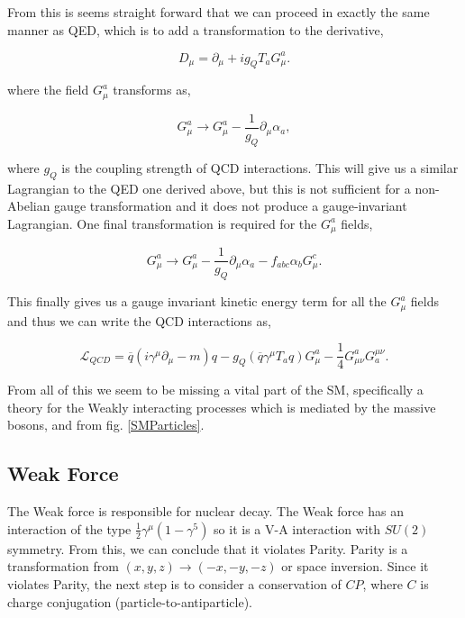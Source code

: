 From this is seems straight forward that we can proceed in exactly the same manner as QED, which is to add a transformation to the derivative,

\begin{equation}
D_\mu=\partial_\mu+ig_Q T_aG_\mu^a.
\end{equation}

where the field $G_\mu^a$ transforms as, 

\begin{equation}
G_\mu^a\rightarrow G_\mu^a-\frac{1}{g_Q}\partial_\mu\alpha_a,
\end{equation}

where $g_Q$ is the coupling strength of QCD interactions. This will give us a similar Lagrangian to the QED one derived above, but this is not sufficient for a non-Abelian gauge transformation and it does not produce a gauge-invariant Lagrangian. One final transformation is required for the $G_\mu^a$ fields, 

\begin{equation}\label{QCDGaugeTransform}
G_\mu^a\rightarrow G_\mu^a-\frac{1}{g_Q}\partial_\mu\alpha_a-f_{abc}\alpha_b G_\mu^c.
\end{equation}

This finally gives us a gauge invariant kinetic energy term for all the $G_\mu^a$ fields and thus we can write the QCD interactions as,

\begin{equation}\label{LagrangianQCD}
\mathcal{L}_{QCD}=\overline{q}(i\gamma^\mu\partial_\mu-m)q-g_Q(\overline{q}\gamma^\mu T_a q)G^a_\mu-\frac{1}{4}G^a_{\mu\nu}G_a^{\mu\nu}.
\end{equation}

From all of this we seem to be missing a vital part of the SM, specifically a theory for the Weakly interacting processes which is mediated by the massive bosons, \W and \Z from fig. \ref{SMParticles}. 

\subsection{Weak Force}
\label{WeakForce}

The Weak force is responsible for nuclear decay. The Weak force has an interaction of the type $\frac{1}{2}\gamma^\mu(1-\gamma^5)$ so it is a V-A interaction with $SU(2)$ symmetry. From this, we can conclude that it violates Parity. Parity is a transformation from $(x, y, z)\rightarrow(-x,-y,-z)$ or space inversion. Since it violates Parity, the next step is to consider a conservation of $CP$, where $C$ is charge conjugation (particle-to-antiparticle). 

